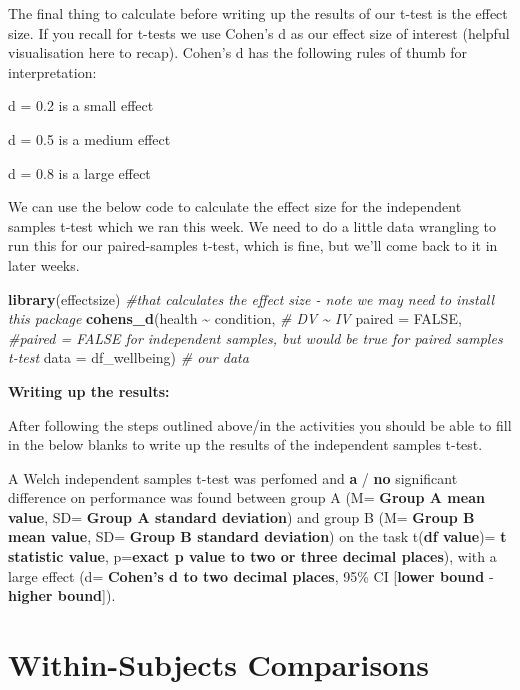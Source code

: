 \documentclass[
]{book}
\newenvironment{Shaded}{\begin{snugshade}}{\end{snugshade}}
\newcommand{\AttributeTok}[1]{\textcolor[rgb]{0.13,0.29,0.53}{#1}}
\newcommand{\CommentTok}[1]{\textcolor[rgb]{0.56,0.35,0.01}{\textit{#1}}}
\newcommand{\ConstantTok}[1]{\textcolor[rgb]{0.56,0.35,0.01}{#1}}
\newcommand{\FunctionTok}[1]{\textcolor[rgb]{0.13,0.29,0.53}{\textbf{#1}}}
\newcommand{\NormalTok}[1]{#1}
\newcommand{\SpecialCharTok}[1]{\textcolor[rgb]{0.81,0.36,0.00}{\textbf{#1}}}
\begin{document}
The final thing to calculate before writing up the results of our t-test is the effect size. If you recall for t-tests we use Cohen's d as our effect size of interest (helpful visualisation here to recap). Cohen's d has the following rules of thumb for interpretation:

d = 0.2 is a small effect

d = 0.5 is a medium effect

d = 0.8 is a large effect

We can use the below code to calculate the effect size for the independent samples t-test which we ran this week. We need to do a little data wrangling to run this for our paired-samples t-test, which is fine, but we'll come back to it in later weeks.

\begin{Shaded}
\begin{Highlighting}[]
\FunctionTok{library}\NormalTok{(effectsize) }\CommentTok{\#that calculates the effect size {-} note we may need to install this package}
\FunctionTok{cohens\_d}\NormalTok{(health }\SpecialCharTok{\textasciitilde{}}\NormalTok{ condition, }\CommentTok{\# DV \textasciitilde{} IV}
              \AttributeTok{paired =} \ConstantTok{FALSE}\NormalTok{, }\CommentTok{\#paired = FALSE for independent samples, but would be true for paired samples t{-}test}
              \AttributeTok{data =}\NormalTok{ df\_wellbeing) }\CommentTok{\# our data}
\end{Highlighting}
\end{Shaded}

\textbf{Writing up the results:}

After following the steps outlined above/in the activities you should be able to fill in the below blanks to write up the results of the independent samples t-test.

A Welch independent samples t-test was perfomed and \textbf{a} / \textbf{no} significant difference on performance was found between group A (M= \textbf{Group A mean value}, SD= \textbf{Group A standard deviation}) and group B (M= \textbf{Group B mean value}, SD= \textbf{Group B standard deviation}) on the task t(\textbf{df value})= \textbf{t statistic value}, p=\textbf{exact p value to two or three decimal places}), with a large effect (d= \textbf{Cohen's d to two decimal places}, 95\% CI {[}\textbf{lower bound} ‐ \textbf{higher bound}{]}).

\section{Within-Subjects Comparisons}\label{within-subjects-comparisons}
\end{document}
